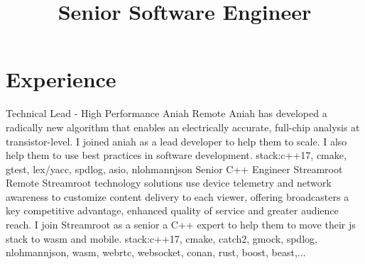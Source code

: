 \documentclass[11pt,a4paper,sans]{moderncv}
\title{Senior Software Engineer}
\begin{document}
\makecvtitle

\section{Experience}

{Technical Lead - High Performance}
{Aniah}
{Remote}
{}
{Aniah has developed a radically new algorithm that enables an electrically accurate, full-chip analysis at transistor-level.
I joined aniah as a lead developer to help them to scale. I also help them to use best practices in software development.\newline{}
stack:c++17, cmake, gtest, lex/yacc, spdlog, asio, nlohmannjson}
{Senior C++ Engineer}
{Streamroot}
{Remote}
{}
{Streamroot technology solutions use device telemetry and network awareness to customize content delivery to each viewer, offering broadcasters a key competitive advantage, enhanced quality of service and greater audience reach.
I join Streamroot as a senior a C++ expert to help them to move their js stack to wasm and mobile.\newline{}
stack:c++17, cmake, catch2, gmock, spdlog, nlohmannjson, wasm, webrtc, websocket, conan, rust, boost, beast,...}
\end{document}
